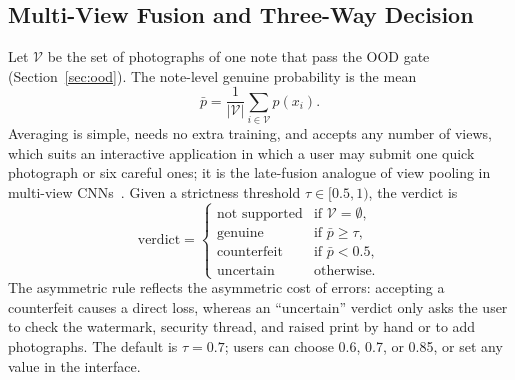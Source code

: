 \documentclass[journal]{IEEEtran}
\begin{document}
\subsection{Multi-View Fusion and Three-Way Decision}
\label{sec:decision}
Let $\mathcal{V}$ be the set of photographs of one note that pass the OOD gate
(Section~\ref{sec:ood}). The note-level genuine probability is the mean
\begin{equation}
\bar{p} = \frac{1}{|\mathcal{V}|}\sum_{i\in\mathcal{V}} p(x_i).
\label{eq:fusion}
\end{equation}
Averaging is simple, needs no extra training, and accepts any number of views, which
suits an interactive application in which a user may submit one quick photograph or six
careful ones; it is the late-fusion analogue of view pooling in multi-view
CNNs~\cite{su2015mvcnn}. Given a strictness threshold $\tau\in[0.5,1)$, the verdict is
\begin{equation}
\text{verdict} =
\begin{cases}
\text{not supported} & \text{if } \mathcal{V}=\emptyset,\\
\text{genuine} & \text{if } \bar{p}\ge\tau,\\
\text{counterfeit} & \text{if } \bar{p}<0.5,\\
\text{uncertain} & \text{otherwise.}
\end{cases}
\label{eq:decision}
\end{equation}
The asymmetric rule reflects the asymmetric cost of errors: accepting a counterfeit
causes a direct loss, whereas an ``uncertain'' verdict only asks the user to check the
watermark, security thread, and raised print by hand or to add photographs. The default
is $\tau=0.7$; users can choose 0.6, 0.7, or 0.85, or set any value in the interface.
\end{document}
